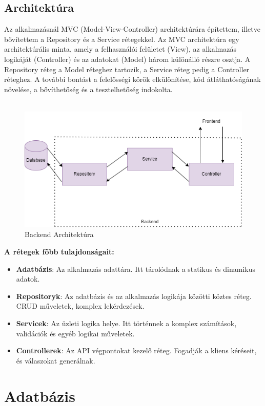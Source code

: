 \subsection{Architektúra}
Az alkalmazásnál MVC (Model-View-Controller) architektúrára építettem, illetve
bővítettem a Repository és a Service rétegekkel. Az MVC architektúra egy
architektúrális minta, amely a felhasználói felületet (View), az alkalmazás
logikáját (Controller) és az adatokat (Model) három különálló részre osztja.
A Repository réteg a Model réteghez tartozik, a Service réteg pedig a Controller réteghez.
A további bontást a felelősségi körök elkülönítése, kód átláthatóságának növelése, a bővíthetőség és a tesztelhetőség indokolta.
\\
\\
\begin{figure}[H]
    \centering
    \includegraphics[width=14.0truecm]{images/Backend_architecture.png}
    \caption{Backend Architektúra}
    \label{fig:backend_architecture}
\end{figure}
\textbf{A rétegek főbb tulajdonságait:}
\begin{itemize}
    \item \textbf{Adatbázis}: Az alkalmazás adattára. Itt tárolódnak a statikus és dinamikus adatok.
    \item \textbf{Repositoryk}: Az adatbázis és az alkalmazás logikája közötti köztes réteg. CRUD műveletek, komplex lekérdezések.
    \item \textbf{Servicek}: Az üzleti logika helye. Itt történnek a komplex számítások, validációk és egyéb logikai műveletek.
    \item \textbf{Controllerek}: Az API végpontokat kezelő réteg. Fogadják a kliens kéréseit, és válaszokat generálnak.
\end{itemize}

\section{Adatbázis}
